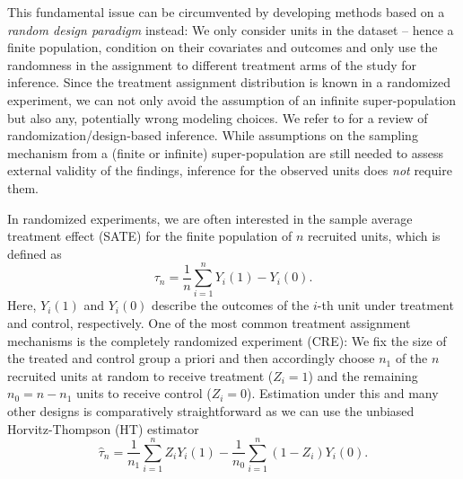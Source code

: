 \documentclass[aos]{imsart2}
\theoremstyle{plain}
\theoremstyle{definition}
\newcommand{\tauh}{\hat{\tau}}
\begin{document}
This fundamental issue can be circumvented by developing methods based on a \emph{random design paradigm} instead: We only consider units in the dataset -- hence a finite population, condition on their covariates and outcomes and only use the randomness in the assignment to different treatment arms of the study for inference. Since the treatment assignment distribution is known in a randomized experiment, we can not only avoid the assumption of an infinite super-population but also any, potentially wrong modeling choices. We refer to \citet{imbens_causal_2015,zhang_2023_randomization_test,ding_first_2024} for a review of randomization/design-based inference. While assumptions on the sampling mechanism from a (finite or infinite) super-population are still needed to assess external validity of the findings, inference for the observed units does \emph{not} require them. %


In randomized experiments, we are often interested in the sample average treatment effect (SATE) for the finite population of $n$ recruited units, which is defined as
\begin{equation*}
    \tau_n = \frac{1}{n} \sum_{i=1}^n Y_i(1)-Y_i(0).
\end{equation*}
Here, $Y_i(1)$ and $Y_i(0)$ describe the outcomes of the $i$-th unit under treatment and control, respectively. One of the most common treatment assignment mechanisms is the completely randomized experiment (CRE): We fix the size of the treated and control group a priori and then accordingly
choose $n_1$ of the $n$ recruited units at random to receive treatment ($Z_i=1$) and the remaining $n_0=n-n_1$ units to receive control ($Z_i=0$). Estimation under this and many other designs is comparatively straightforward as we can use the unbiased Horvitz-Thompson (HT) estimator
\begin{equation*}
    \tauh_n = \frac{1}{n_1} \sum_{i=1}^n Z_i Y_i(1)-\frac{1}{n_0}\sum_{i=1}^n(1-Z_i)Y_i(0).
\end{equation*}
\end{document}
